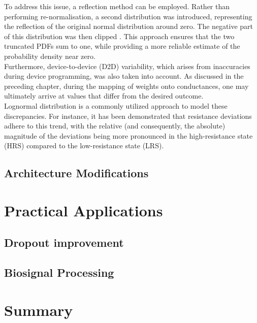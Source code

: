 \noindent To address this issue, a reflection method can be employed. Rather than performing re-normalisation, a second distribution was introduced, representing the reflection of the original normal distribution around zero. The negative part of this distribution was then clipped \cite{jones1993simple}. This approach ensures that the two truncated PDFs sum to one, while providing a more reliable estimate of the probability density near zero.\\

\noindent Furthermore, device-to-device (D2D) variability, which arises from inaccuracies during device programming, was also taken into account. As discussed in the preceding chapter, during the mapping of weights onto conductances, one may ultimately arrive at values that differ from the desired outcome. \\

\noindent Lognormal distribution is a commonly utilized approach to model these discrepancies. For instance, it has been demonstrated that resistance deviations adhere to this trend, with the relative (and consequently, the absolute) magnitude of the deviations being more pronounced in the high-resistance state (HRS) compared to the low-resistance state (LRS).

\subsection{Architecture Modifications}

\section[Practical Applications]{Practical Applications}

\subsection{Dropout improvement}

\subsection{Biosignal Processing}

\section[Summary]{Summary}